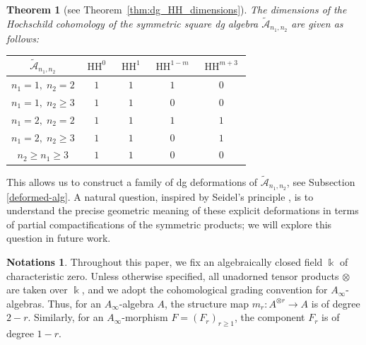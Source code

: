 \documentclass[a4paper, reqno, 11pt]{amsart}
\newtheorem{theorem}{Theorem}[section]
\theoremstyle{definition}
\newtheorem*{notation}{Notations}
\begin{document}
	\begin{theorem}[see Theorem~\ref{thm:dg_HH_dimensions}]
		The dimensions of the Hochschild cohomology of the symmetric square dg algebra $\widetilde{\mathcal{A}}_{n_1,n_2}$ are given as follows:
		\begin{center}
			\renewcommand{\arraystretch}{1.2}
			\begin{tabular}{c|cccc}
				\hline
				$\widetilde{\mathcal A}_{n_1,n_2}$ & $\operatorname{HH}^{0}$ & $\operatorname{HH}^{1}$ & $\operatorname{HH}^{1-m}$ & $\operatorname{HH}^{m+3}$ \\
				\hline
				$n_1=1,\; n_2=2$ & $1$ & $1$ & $1$ & $0$ \\
				$n_1=1,\; n_2\ge 3$ & $1$ & $1$ & $0$ & $0$ \\
				$n_1=2,\; n_2=2$ & $1$ & $1$ & $1$ & $1$ \\
				$n_1=2,\; n_2\ge 3$ & $1$ & $1$ & $0$ & $1$ \\
				$n_2\ge n_1\ge 3$ & $1$ & $1$ & $0$ & $0$ \\
				\hline
			\end{tabular}
		\end{center}
	\end{theorem}
	
	This allows us to construct a family of dg deformations of $\widetilde{\mathcal{A}}_{n_1,n_2}$, see Subsection \ref{deformed-alg}.  A natural question, inspired by Seidel's principle \cite{Seidel2002}, is to understand the precise geometric meaning of these explicit deformations in terms of partial compactifications of the symmetric products; we will explore this question in future work.
	
	
	
	\begin{notation}
		Throughout this paper, we fix an algebraically closed field $\Bbbk$ of characteristic zero. Unless otherwise specified, all unadorned tensor products $\otimes$ are taken over $\Bbbk$, and we adopt the cohomological grading convention for \(A_\infty\)-algebras. Thus, for an \(A_\infty\)-algebra \(A\), the structure map $m_r\colon A^{\otimes r}\longrightarrow A$
		is of degree \(2-r\). Similarly, for an \(A_\infty\)-morphism \(F=(F_r)_{r\geq 1}\), the component \(F_r\) is of degree \(1-r\).
	\end{notation}
	
\end{document}
